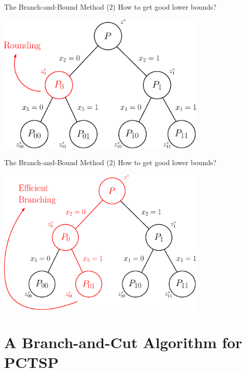 \documentclass[10pt]{beamer}
\begin{document}
\begin{frame}[t]{The Branch-and-Bound Method (2)}
    How to get good lower bounds?
    \begin{center}
        \includegraphics[width=10cm]{b_and_b006.eps} 
    \end{center}
\end{frame}

\begin{frame}[t]{The Branch-and-Bound Method (2)}
    How to get good lower bounds?
    \begin{center}
        \includegraphics[width=10cm]{b_and_b007.eps} 
    \end{center}
\end{frame}


\section{A Branch-and-Cut Algorithm for PCTSP}
\end{document}
